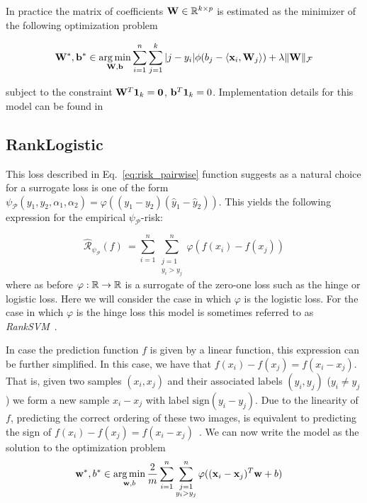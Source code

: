 In practice the matrix of coefficients $\mathbf{W} \in {\mathbb R}^{k \times p}$ is estimated as the minimizer of the following optimization problem

$$
\mathbf{W}^*, \mathbf{b}^* \in \operatorname*{arg\,min}_{\mathbf{W}, \mathbf{b}} \sum_{i=1}^n\sum_{j=1}^{k} |j - y_i|\phi(b_j-\langle \mathbf{x}_i, \mathbf{W}_j \rangle) + \lambda \|\mathbf{W}\|_{\mathcal{F}}
$$

subject to the constraint $\mathbf{W}^T \mathbf{1}_{k} = \mathbf{0}$, $\mathbf{b}^T \mathbf{1}_{k}  = 0$. Implementation details for this model can be found in~\citep{zhang2008, Zhang_bayesianmulticategory, statnikov2005comprehensive}


\subsection{RankLogistic}



This loss described in Eq.~\eqref{eq:risk_pairwise} function suggests as a natural choice for a surrogate loss is one of the form~\citep{Herbrich2000, freund2003efficient, Dekel2004} $\psi_{\mathcal{P}}(y_1, y_2, \alpha_1, \alpha_2) = \varphi((y_1 - y_2) (\hat{y}_1 - \hat{y}_2))$. This yields the following expression for the empirical $\psi_{\mathcal{P}}$-risk:



\begin{equation}\label{eq:pairwise_surrogate}
\hat{\mathcal{R}}_{\psi_{\mathcal{P}}}(f) ~= \sum_{i=1}^n \sum_{\substack{j=1\\  y_i > y_j}}^n \varphi (f(x_i) - f(x_j))
\end{equation}
where as before $\varphi: {\mathbb R} \to {\mathbb R}$ is a surrogate of the zero-one loss such as the hinge or logistic loss. Here we will consider the case in which $\varphi$ is the logistic loss. For the case in which $\varphi$ is the hinge loss this model is sometimes referred to as \emph{RankSVM}~\citep{Herbrich2000, Joachims2002}. 


In case the prediction function $f$ is given by a linear function, this expression can be further simplified. In this case, we have that 
$f(x_i) - f(x_j) = f(x_i - x_j)$. That is, given two samples $({x}_i, {x}_j)$ and their associated labels
$(y_i, y_j)$ ($y_i \neq y_j$) we form a new sample
${x}_i - {x}_j$ with label $\text{sign}({y}_i - {y}_j)$. Due to
the linearity of $f$, predicting the correct ordering of these two
images, is equivalent to predicting the sign of $f({x}_i) -
f({x}_j)= f(x_i - x_j)$~\citep{Herbrich2000}. We can now write the model as the solution to the optimization problem
$$
\mathbf{w}^*, b^* \in \operatorname*{arg\,min}_{\mathbf{w}, b} \frac{2}{m} \sum_{i=1}^n  \sum_{\substack{j=1\\  y_i > y_j}}^n \varphi ((\mathbf{x}_i - \mathbf{x}_j)^T \mathbf{w} + b) \quad
$$




